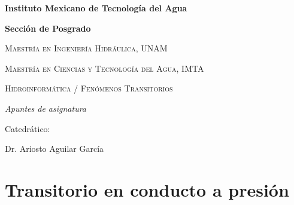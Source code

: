 \documentclass[letterpaper]{report}
\begin{document}
	
\renewcommand{\contentsname}{Contenido}
\renewcommand{\listtablename}{Índice de tablas}
\renewcommand{\tablename}{Tabla}

\begin{titlepage}
	\centering
	{\bfseries\LARGE Instituto Mexicano de Tecnología del Agua \par}
	\vspace{1cm}
	{\bfseries\LARGE  Sección de Posgrado \par}
	\vspace{1cm}
	{\scshape\Large Maestría en Ingeniería Hidráulica, UNAM \par}
	\vspace{1cm}
	{\scshape\Large Maestría en Ciencias y Tecnología del Agua, IMTA \par}
	\vspace{3cm}
	{\scshape\Huge Hidroinformática / Fenómenos Transitorios  \par}
	\vspace{3cm}
	{\itshape\Large Apuntes de asignatura \par}
	\vfill
	{\Large Catedrático: \par}
	{\Large Dr. Ariosto Aguilar García \par}
	\vfill
\end{titlepage}

\tableofcontents
\listoffigures
\listoftables

\chapter{Transitorio en conducto a presión}

\end{document}
